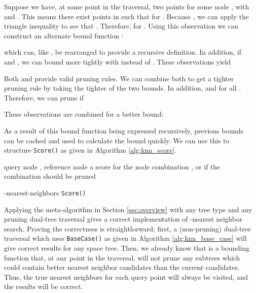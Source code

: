 \documentclass{article}
\begin{document}
Suppose we have, at some point in the traversal, two points  for some node , with
 and .  This means there exist  points  in
 such that  for .
Because , we can apply the triangle inequality to
see that .  Therefore,  for . Using
this observation we can construct an alternate bound function
:



which can, like , be rearranged to provide a recursive
definition.  In addition, if  and , we can bound  more tightly with
 instead of .  These observations yield



Both  and  provide valid pruning rules.
We can combine both to get a tighter pruning rule by taking the tighter
of the two bounds.  In addition,  and
 for all .  Therefore, we can prune  if


\newpage
These observations are combined for a better bound:

\vspace*{-1.3em}

\vspace*{-0.3em}

As a result of this bound function being expressed recursively, previous bounds
can be cached and used to calculate the bound  quickly.  We
can use this to structure \texttt{Score()} as given in Algorithm
\ref{alg:knn_score}.

\begin{algorithm}[tb]
  \begin{algorithmic}
     query node , reference node 
     a score for the node combination , or  if the combination should be pruned

    \medskip

    \IF{}
      \RETURN 
    \ENDIF

    \medskip
    \RETURN 
  \end{algorithmic}

  \caption{-nearest-neighbors \texttt{Score()}}
  \label{alg:knn_score}
\end{algorithm}

Applying the meta-algorithm in Section \ref{sec:overview} with any tree type and
any pruning dual-tree traversal gives a correct implementation of -nearest
neighbor search.  Proving the correctness is straightforward; first, a (non-pruning) dual-tree traversal which uses \texttt{BaseCase()} as
given in Algorithm \ref{alg:knn_base_case} will give correct results for any
space tree.  Then, we already know that  is a bounding
function that, at any point in the traversal, will not prune any subtrees which
could contain better nearest neighbor candidates than the current candidates.
Thus, the true nearest neighbors for each query point will always be visited,
and the results will be correct.
\end{document}
